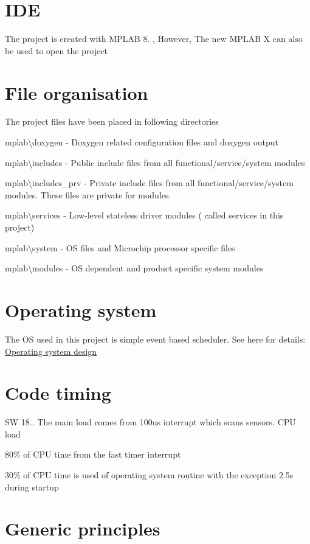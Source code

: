 \hypertarget{index_IDE}{}\section{I\+D\+E}\label{index_IDE}
The project is created with M\+P\+L\+A\+B 8. , However, The new M\+P\+L\+A\+B X can also be used to open the project\hypertarget{index_files}{}\section{File organisation}\label{index_files}
The project files have been placed in following directories
\begin{DoxyItemize}
\item mplab\textbackslash{}doxygen -\/ Doxygen related configuration files and doxygen output
\item mplab\textbackslash{}includes -\/ Public include files from all functional/service/system modules
\item mplab\textbackslash{}includes\+\_\+prv -\/ Private include files from all functional/service/system modules. These files are private for modules.
\item mplab\textbackslash{}services -\/ Low-\/level stateless driver modules ( called services in this project)
\item mplab\textbackslash{}system -\/ O\+S files and Microchip processor specific files
\item mplab\textbackslash{}modules -\/ O\+S dependent and product specific system modules
\end{DoxyItemize}\hypertarget{index_os}{}\section{Operating system}\label{index_os}
The O\+S used in this project is simple event based scheduler. See here for details\+: \hyperlink{a00012}{Operating system design}\hypertarget{index_measurements}{}\section{Code timing}\label{index_measurements}
S\+W 18.. The main load comes from 100us interrupt which scans sensors. C\+P\+U load
\begin{DoxyItemize}
\item 80\% of C\+P\+U time from the fast timer interrupt
\item 30\% of C\+P\+U time is used of operating system routine with the exception 2.\+5s during startup
\end{DoxyItemize}\hypertarget{index_genpri}{}\section{Generic principles}\label{index_genpri}

